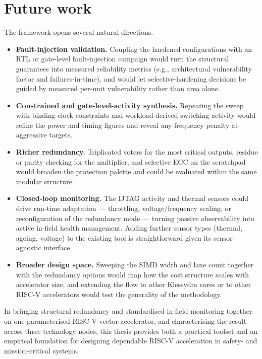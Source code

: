 \section{Future work}

The framework opens several natural directions.

\begin{itemize}
  \item \textbf{Fault-injection validation.} Coupling the hardened
        configurations with an RTL or gate-level fault-injection campaign would
        turn the structural guarantees into measured reliability metrics (e.g.,
        architectural vulnerability factor and failures-in-time), and would let
        selective-hardening decisions be guided by measured per-unit
        vulnerability rather than area alone.
  \item \textbf{Constrained and gate-level-activity synthesis.} Repeating the
        sweep with binding clock constraints and workload-derived switching
        activity would refine the power and timing figures and reveal any
        frequency penalty at aggressive targets.
  \item \textbf{Richer redundancy.} Triplicated voters for the most critical
        outputs, residue or parity checking for the multiplier, and selective
        ECC on the scratchpad would broaden the protection palette and could be
        evaluated within the same modular structure.
  \item \textbf{Closed-loop monitoring.} The IJTAG activity and thermal sensors
        could drive run-time adaptation --- throttling, voltage/frequency
        scaling, or reconfiguration of the redundancy mode --- turning passive
        observability into active in-field health management. Adding further
        sensor types (thermal, ageing, voltage) to the existing tool is
        straightforward given its sensor-agnostic interface.
  \item \textbf{Broader design space.} Sweeping the SIMD width and lane count
        together with the redundancy options would map how the cost structure
        scales with accelerator size, and extending the flow to other Klessydra
        cores or to other RISC-V accelerators would test the generality of the
        methodology.
\end{itemize}

In bringing structural redundancy and standardised in-field monitoring together
on one parameterised RISC-V vector accelerator, and characterising the result
across three technology nodes, this thesis provides both a practical toolset and
an empirical foundation for designing dependable RISC-V acceleration in
safety- and mission-critical systems.
